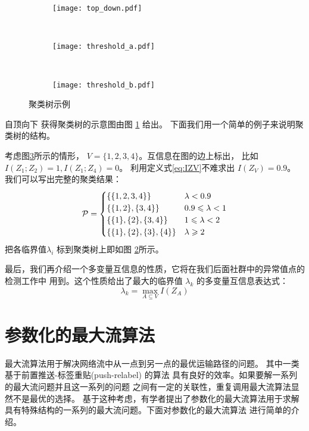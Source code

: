   \begin{figure}[!ht]
    \centering
    \begin{subfigure}[b]{0.38\linewidth}
      \centering
      \texttt{[image: top\_down.pdf]}
      \caption{}\label{fig:top_down}
    \end{subfigure}~
  \begin{subfigure}[b]{0.33\linewidth}
    \centering
    \texttt{[image: threshold\_a.pdf]}
    \caption{}\label{fig:threshold_a}
  \end{subfigure}~
  \begin{subfigure}[b]{0.29\linewidth}
    \centering
    \texttt{[image: threshold\_b.pdf]}
    \caption{}\label{fig:threshold_b}
  \end{subfigure}
    \caption{聚类树示例}\label{fig:mmi_example}
  \end{figure}
自顶向下
获得聚类树的示意图由图 \ref{fig:top_down} 给出。
下面我们用一个简单的例子来说明聚类树的结构。
  \begin{example}\label{ex:mmi_tree}
考虑图\ref{fig:threshold_b}所示的情形，
$V=\{1,2,3,4\}$。互信息在图的边上标出，
比如 $I(Z_1;Z_2)=1, I(Z_1;Z_4)=0$。
利用定义式\ref{eq:IZV}不难求出
$I(Z_V)=0.9$。 
我们可以写出完整的聚类结果：
\begin{equation*}
\P = 
\begin{cases}
\{\{1,2,3,4\}\} & \lambda < 0.9 \\
\{\{1,2\},\{3,4\}\} & 0.9 \leq \lambda < 1 \\
\{\{1\},\{2\},\{3,4\}\} & 1 \leq \lambda < 2\\
\{\{1\},\{2\},\{3\},\{4\}\} & \lambda \geq 2
\end{cases}
\end{equation*}
把各临界值$\lambda_i$ 标到聚类树上即如图
\ref{fig:threshold_a}所示。
\end{example}
最后，我们再介绍一个多变量互信息的性质，它将在我们后面社群中的异常值点的检测工作中
用到。这个性质给出了最大的临界值 $\lambda_k$ 的多变量互信息表达式\cite{agg_ic}：
\begin{equation}\label{eq:largest_threshold}
\lambda_k = \max_{A\subseteq V} I(Z_A)
\end{equation}

\section{参数化的最大流算法}
最大流算法用于解决网络流中从一点到另一点的最优运输路径的问题。
其中一类基于前置推送-标签重贴(push-relabel) \cite{Goldberg1988} 的算法
具有良好的效率。如果要解一系列的最大流问题并且这一系列的问题
之间有一定的关联性，重复调用最大流算法显然不是最优的选择。
基于这种考虑，有学者提出了参数化的最大流算法\cite{Gallo1989}用于求解
具有特殊结构的一系列的最大流问题。下面对参数化的最大流算法
进行简单的介绍。

